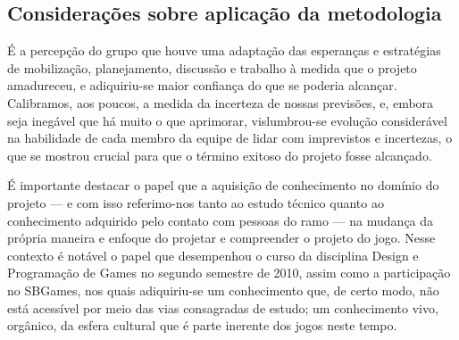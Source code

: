 \subsection{Considerações sobre aplicação da metodologia}

É a percepção do grupo que houve uma adaptação das esperanças e estratégias de mobilização, planejamento, discussão e trabalho à medida que o projeto amadureceu, e adiquiriu-se maior confiança do que se poderia alcançar. Calibramos, aos poucos, a medida da incerteza de nossas previsões, e, embora seja inegável que há muito o que aprimorar, vislumbrou-se evolução considerável na habilidade de cada membro da equipe de lidar com imprevistos e incertezas, o que se mostrou crucial para que o término exitoso do projeto fosse alcançado.

É importante destacar o papel que a aquisição de conhecimento no domínio do projeto --- e com isso referimo-nos tanto ao estudo técnico quanto ao conhecimento adquirido pelo contato com pessoas do ramo --- na mudança da própria maneira e enfoque do projetar e compreender o projeto do jogo. Nesse contexto é notável o papel que desempenhou o curso da disciplina Design e Programação de Games no segundo semestre de 2010, assim como a participação no SBGames, nos quais adiquiriu-se um conhecimento que, de certo modo, não está acessível por meio das vias consagradas de estudo; um conhecimento vivo, orgânico, da esfera cultural que é parte inerente dos jogos neste tempo.


